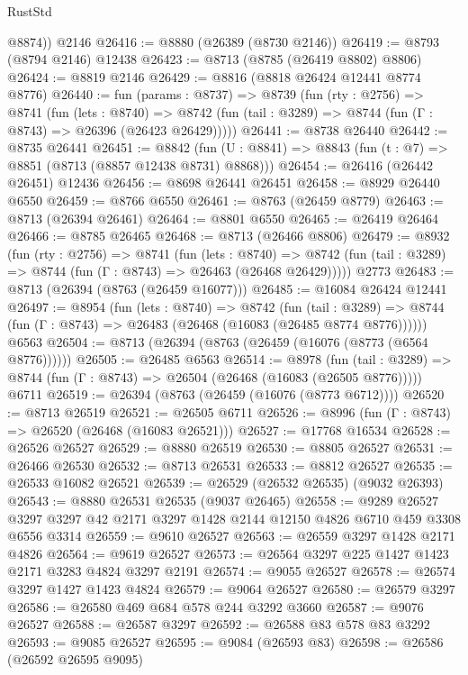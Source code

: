 \begin{lexlean}{RustStd}
\begin{coremodule}
        @8874))
    @2146
@26416 := @8880 (@26389 (@8730 @2146))
@26419 := @8793 (@8794 @2146) @12438
@26423 := @8713 (@8785 (@26419 @8802) @8806)
@26424 := @8819 @2146
@26429 := @8816 (@8818 @26424 @12441 @8774 @8776)
@26440 := fun (params : @8737) =>
  @8739
    (fun (rty : @2756) =>
    @8741
      (fun (lets : @8740) =>
      @8742 (fun (tail : @3289) => @8744 (fun (Γ : @8743) => @26396 (@26423 @26429)))))
@26441 := @8738 @26440
@26442 := @8735 @26441
@26451 := @8842
    (fun (U : @8841) => @8843 (fun (t : @7) => @8851 (@8713 (@8857 @12438 @8731) @8868)))
@26454 := @26416 (@26442 @26451) @12436
@26456 := @8698 @26441 @26451
@26458 := @8929 @26440 @6550
@26459 := @8766 @6550
@26461 := @8763 (@26459 @8779)
@26463 := @8713 (@26394 @26461)
@26464 := @8801 @6550
@26465 := @26419 @26464
@26466 := @8785 @26465
@26468 := @8713 (@26466 @8806)
@26479 := @8932
    (fun (rty : @2756) =>
    @8741
      (fun (lets : @8740) =>
      @8742 (fun (tail : @3289) => @8744 (fun (Γ : @8743) => @26463 (@26468 @26429)))))
    @2773
@26483 := @8713 (@26394 (@8763 (@26459 @16077)))
@26485 := @16084 @26424 @12441
@26497 := @8954
    (fun (lets : @8740) =>
    @8742
      (fun (tail : @3289) =>
      @8744 (fun (Γ : @8743) => @26483 (@26468 (@16083 (@26485 @8774 @8776))))))
    @6563
@26504 := @8713 (@26394 (@8763 (@26459 (@16076 (@8773 (@6564 @8776))))))
@26505 := @26485 @6563
@26514 := @8978
    (fun (tail : @3289) => @8744 (fun (Γ : @8743) => @26504 (@26468 (@16083 (@26505 @8776)))))
    @6711
@26519 := @26394 (@8763 (@26459 (@16076 (@8773 @6712))))
@26520 := @8713 @26519
@26521 := @26505 @6711
@26526 := @8996 (fun (Γ : @8743) => @26520 (@26468 (@16083 @26521)))
@26527 := @17768 @16534
@26528 := @26526 @26527
@26529 := @8880 @26519
@26530 := @8805 @26527
@26531 := @26466 @26530
@26532 := @8713 @26531
@26533 := @8812 @26527
@26535 := @26533 @16082 @26521
@26539 := @26529 (@26532 @26535) (@9032 @26393)
@26543 := @8880 @26531 @26535 (@9037 @26465)
@26558 := @9289
    @26527
    @3297
    @3297
    @42
    @2171
    @3297
    @1428
    @2144
    @12150
    @4826
    @6710
    @459
    @3308
    @6556
    @3314
@26559 := @9610 @26527
@26563 := @26559 @3297 @1428 @2171 @4826
@26564 := @9619 @26527
@26573 := @26564 @3297 @225 @1427 @1423 @2171 @3283 @4824 @3297 @2191
@26574 := @9055 @26527
@26578 := @26574 @3297 @1427 @1423 @4824
@26579 := @9064 @26527
@26580 := @26579 @3297
@26586 := @26580 @469 @684 @578 @244 @3292 @3660
@26587 := @9076 @26527
@26588 := @26587 @3297
@26592 := @26588 @83 @578 @83 @3292
@26593 := @9085 @26527
@26595 := @9084 (@26593 @83)
@26598 := @26586 (@26592 @26595 @9095)

\end{coremodule}
\end{lexlean}
